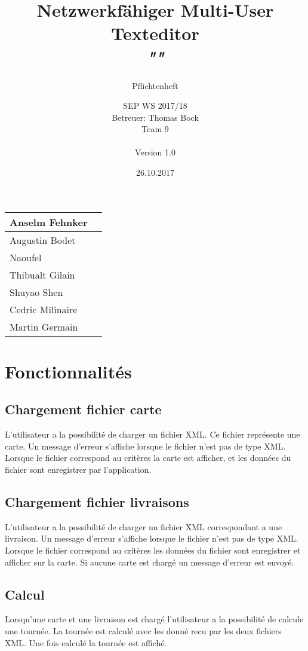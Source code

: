 \documentclass{scrartcl}
\title{Netzwerkfähiger Multi-User Texteditor\\
\textit{"\name"}}
\subtitle{Pflichtenheft}
\author{SEP WS 2017/18\\
Betreuer: Thomas Bock\\
Team 9\\ \\
Version 1.0}
\date{26.10.2017}
\begin{document}
\maketitle

\iffalse
\begin{figure}[h]
	\centering
  \texttt{[image: ../img/insta\_logo]}
	\label{fig:logo}
\end{figure}
\fi
\vfill

\begin{center}
  \begin{tabular}{ | l | r | }
    \hline
    Anselm Fehnker \\ \hline
    Augustin Bodet  \\ \hline
    Naoufel \\ \hline
    Thibualt Gilain \\ \hline
    Shuyao Shen \\ \hline
    Cedric Milinaire\\ \hline
    Martin Germain \\ \hline
  \end{tabular}
\end{center}

\thispagestyle{empty}
\pagebreak
\renewcommand{\contentsname}{Table des matières}
\tableofcontents
\newpage

\section{Fonctionnalités}
\subsection{Chargement fichier carte}
L'utilisateur a la possibilité de charger un fichier XML. Ce fichier représente une carte. Un message d'erreur s'affiche lorsque le fichier n'est pas de type XML. Lorsque le fichier correspond au critères la carte est afficher, et les données du fichier sont enregistrer par l'application. 
\subsection{Chargement fichier livraisons}
L'utilisateur a la possibilité de charger un fichier XML correspondant a une livraison. Un message d'erreur s'affiche lorsque le fichier n'est pas de type XML. Lorsque le fichier correspond au critères les données du fichier sont enregistrer et afficher sur la carte. Si aucune carte est chargé un message d'erreur est envoyé. 
\subsection{Calcul}
Lorsqu'une carte et une livraison est chargé l'utilisateur a la possibilité de calcule une tournée. La tournée est calculé avec les donné recu par les deux fichiers XML. Une fois calculé la tournée est affiché. 
\end{document}
